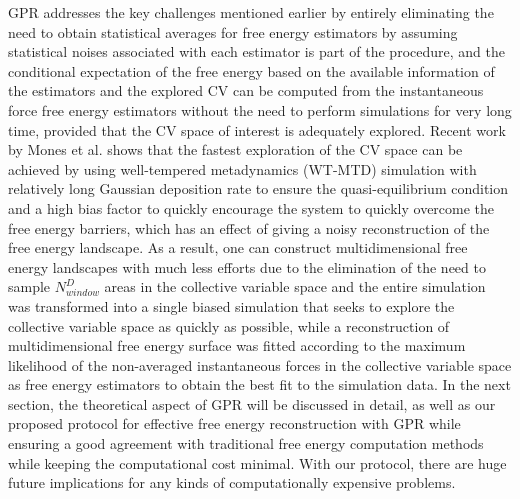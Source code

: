 \begin{spacing}{2.0}
    GPR addresses the key challenges mentioned earlier by entirely eliminating the need to obtain statistical averages for free energy estimators 
    by assuming statistical noises associated with each estimator is part of the procedure, and the conditional expectation of the free energy 
    based on the available information of the estimators and the explored CV can be computed from the instantaneous force free energy estimators 
    without the need to perform simulations for very long time, provided that the CV space of interest is adequately explored. Recent work by 
    Mones et al. \cite{P-JCTC-2016-v12-Mones} shows that the fastest exploration of the CV space can be achieved by using well-tempered metadynamics 
    (WT-MTD) \cite{P-PhysRevLett-2008-v100-Barducci,P-BiophysJ-2010-v98-Barducci,P-PhysRevLett-2014-v112-Dama} simulation with 
    relatively long Gaussian deposition rate to ensure the quasi-equilibrium condition and a high bias factor to quickly encourage the system to 
    quickly overcome the free energy barriers, which has an effect of giving a noisy reconstruction of the free energy landscape. As a result, 
    one can construct multidimensional free energy landscapes with much less efforts due to the elimination of the need to sample $N_{window}^D$
    areas in the collective variable space and the entire simulation was transformed into a single biased simulation that seeks to explore the
    collective variable space as quickly as possible, while a reconstruction of multidimensional free energy surface was fitted according to the 
    maximum likelihood of the non-averaged instantaneous forces in the collective variable space as free energy estimators to obtain the best fit 
    to the simulation data. In the next section, the theoretical aspect of GPR will be discussed in detail, as well as our proposed protocol for 
    effective free energy reconstruction with GPR while ensuring a good agreement with traditional free energy computation methods while keeping 
    the computational cost minimal. With our protocol, there are huge future implications for any kinds of computationally expensive problems.
\end{spacing}
